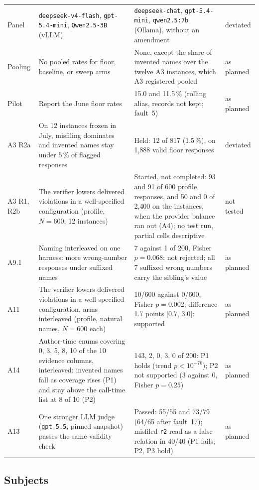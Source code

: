 \documentclass[10pt,twocolumn]{article}
\begin{document}
\begin{table}[!tp]
\begin{tabular}{@{}lp{5.4cm}p{8.9cm}l@{}}
Panel & \texttt{deepseek-v4-flash}, \texttt{gpt-5.4-mini}, \texttt{Qwen2.5-3B} (vLLM) & \texttt{deepseek-chat}, \texttt{gpt-5.4-mini}, \texttt{qwen2.5:7b} (Ollama), without an amendment & deviated \\
Pooling & No pooled rates for floor, baseline, or sweep arms & None, except the share of invented names over the twelve A3 instances, which A3 registered pooled & as planned \\
Pilot & Report the June floor rates & 15.0 and 11.5\,\% (rolling alias, records not kept; fault~5) & as planned \\
\midrule
A3 R2a & On 12 instances frozen in July, misfiling dominates and invented names stay under 5\,\% of flagged responses & Held: 12 of 817 (1.5\,\%), on 1{,}888 valid floor responses & deviated \\
A3 R1, R2b & The verifier lowers delivered violations in a well-specified configuration (profile, $N=600$; 12 instances) & Started, not completed: 93 and 91 of 600 profile responses, and 50 and 0 of 2{,}400 on the instances, when the provider balance ran out (A4); no test run, partial cells descriptive & not tested \\
A9.1 & Naming interleaved on one harness: more wrong-number responses under suffixed names & 7 against 1 of 200, Fisher $p=0.068$: not rejected; all 7 suffixed wrong numbers carry the sibling's value & as planned \\
A11 & The verifier lowers delivered violations in a well-specified configuration, arms interleaved (profile, natural names, $N=600$ each) & 10/600 against 0/600, Fisher $p=0.002$; difference 1.7 points [0.7, 3.0]: supported & as planned \\
A14 & Author-time enums covering 0, 3, 5, 8, 10 of the 10 evidence columns, interleaved: invented names fall as coverage rises (P1) and stay above the call-time list at 8 of 10 (P2) & 143, 2, 0, 3, 0 of 200: P1 holds (trend $p<10^{-76}$); P2 not supported (3 against 0, Fisher $p=0.25$) & as planned \\
A13 & One stronger LLM judge (\texttt{gpt-5.5}, pinned snapshot) passes the same validity check & Passed: 55/55 and 73/79 (64/65 after fault~17); misfiled \texttt{r2} read as a false relation in 40/40 (P1 fails; P2, P3 hold) & as planned \\
\bottomrule
\end{tabular}
\end{table}

\subsection{Subjects}
\end{document}
